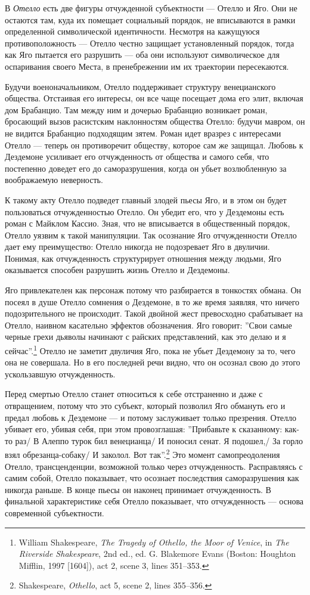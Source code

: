 \documentclass[12pt]{book}
\begin{document}
В \textit{Отелло} есть две фигуры отчужденной субъектности --- Отелло и Яго. Они не остаются там, куда их помещает социальный порядок, не вписываются в рамки определенной символической идентичности. Несмотря на кажущуюся противоположность --- Отелло честно защищает установленный порядок, тогда как Яго пытается его разрушить --- оба они используют символическое для оспаривания своего Места, в пренебрежении им их траектории пересекаются.

Будучи военоначальником, Отелло поддерживает структуру венецианского общества. Отстаивая его интересы, он все чаще посещает дома его элит, включая дом Брабанцио. Там между ним и дочерью Брабанцио возникает роман, бросающий вызов расистским наклонностям общества Отелло: будучи мавром, он не видится Брабанцио подходящим зятем. Роман идет вразрез с интересами Отелло --- теперь он противоречит обществу, которое сам же защищал. Любовь к Дездемоне усиливает его отчужденность от общества и самого себя, что постепенно доведет его до саморазрушения, когда он убьет возлюбленную за воображаемую неверность.

К такому акту Отелло подведет главный злодей пьесы Яго, и в этом он будет пользоваться отчужденностью Отелло. Он убедит его, что у Дездемоны есть роман с Майклом Кассио. Зная, что не вписывается в общественный порядок, Отелло уязвим к такой манипуляции. Так осознание Яго отчужденности Отелло дает ему преимущество: Отелло никогда не подозревает Яго в двуличии. Понимая, как отчужденность структурирует отношения между людьми, Яго оказывается способен разрушить жизнь Отелло и Дездемоны.

Яго привлекателен как персонаж потому что разбирается в тонкостях обмана. Он посеял в душе Отелло сомнения о Дездемоне, в то же время заявляя, что ничего подозрительного не происходит. Такой двойной жест превосходно срабатывает на Отелло, наивном касательно эффектов обозначения. Яго говорит: ''Свои самые черные грехи дьяволы начинают с райских представлений, как это делаю и я сейчас''.\footnote{William Shakespeare, \textit{The Tragedy of Othello, the Moor of Venice}, in \textit{The Riverside Shakespeare}, 2nd ed., ed. G. Blakemore Evans (Boston: Houghton Mifflin, 1997 [1604]), act 2, scene 3, lines 351–353.} Отелло не заметит двуличия Яго, пока не убьет Дездемону за то, чего она не совершала. Но в его последней речи видно, что он осознал свою до этого ускользавшую отчужденность.

Перед смертью Отелло станет относиться к себе отстраненно и даже с отвращением, потому что это субъект, который позволил Яго обмануть его и предал любовь к Дездемоне --- и потому заслуживает только презрения. Отелло убивает его, убивая себя, при этом провозглашая: ''Прибавьте к сказанному: как-то раз/ В Алеппо турок бил венецианца/ И поносил сенат. Я подошел,/ За горло взял обрезанца-собаку/ И заколол. Вот так''.\footnote{Shakespeare, \textit{Othello}, act 5, scene 2, lines 355–356.} Это момент самопреодоления Отелло, трансценденции, возможной только через отчужденность. Расправляясь с самим собой, Отелло показывает, что осознает последствия саморазрушения как никогда раньше. В конце пьесы он наконец принимает отчужденность. В финальной характеристике себя Отелло показывает, что отчужденность --- основа современной субъектности.
\end{document}
